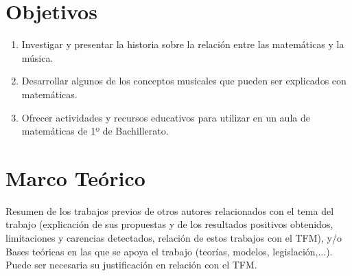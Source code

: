 \documentclass[a4paper, openright, 11pt, titlepage]{report}
\theoremstyle{definition}\newtheorem{defin}[propo]{Definition}
\theoremstyle{definition}\newtheorem{obser}[propo]{Remark}
\theoremstyle{definition}\newtheorem{ejem}[propo]{Ejemplo}
\theoremstyle{definition}\newtheorem{algoritmo}[propo]{Algoritmo}
\begin{document}
\section{Objetivos}
\begin{enumerate}
    \item Investigar y presentar la historia sobre la relación entre las matemáticas y la música.
    \item Desarrollar algunos de los conceptos musicales que pueden ser explicados con matemáticas. 
    \item Ofrecer actividades y recursos educativos para utilizar en un aula de matemáticas de 1º de Bachillerato.
\end{enumerate}
\section{Marco Teórico}
Resumen de los trabajos previos de otros autores relacionados con el tema del trabajo (explicación de sus propuestas y de los resultados positivos obtenidos, limitaciones y carencias detectados, relación de estos trabajos con el TFM), y/o
Bases teóricas en las que se apoya el trabajo (teorías, modelos, legislación,...). Puede ser necesaria su justificación en relación con el TFM.
\newpage
\end{document}
